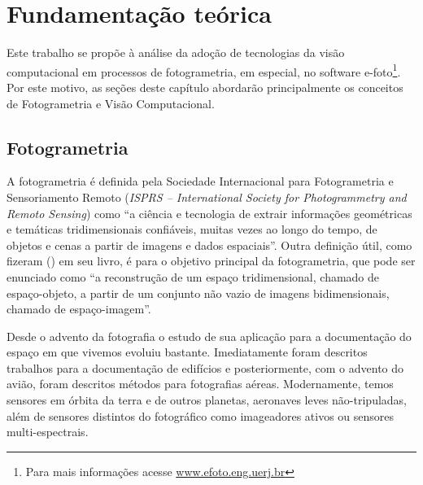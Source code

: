 \chapter{Fundamentação teórica}\label{chp:fund}


Este trabalho se propõe à análise da adoção de tecnologias da visão computacional em processos de fotogrametria, em especial, no software e-foto\footnote{Para mais informações acesse \url{www.efoto.eng.uerj.br}}. Por este motivo, as seções deste capítulo abordarão principalmente os conceitos de Fotogrametria e Visão Computacional.

\section{Fotogrametria}

A fotogrametria é definida pela Sociedade Internacional para Fotogrametria e Sensoriamento Remoto (\textit{ISPRS – International Society for Photogrammetry and Remoto Sensing}) como ``a ciência e tecnologia de extrair informações geométricas e temáticas tridimensionais confiáveis, muitas vezes ao longo do tempo, de objetos e cenas a partir de imagens e dados espaciais''\cite{isprs2021}. Outra definição útil, como fizeram  (\citeyear{coelho2007fotogrametria}) em seu livro, é para o objetivo principal da fotogrametria, que pode ser enunciado como ``a reconstrução de um espaço tridimensional, chamado de espaço-objeto, a partir de um conjunto não vazio de imagens bidimensionais, chamado de espaço-imagem''. 

Desde o advento da fotografia o estudo de sua aplicação para a documentação do espaço em que vivemos evoluiu bastante. Imediatamente foram descritos trabalhos para a documentação de edifícios e posteriormente, com o advento do avião, foram descritos métodos para fotografias aéreas. Modernamente, temos sensores em órbita da terra e de outros planetas, aeronaves leves não-tripuladas, além de sensores distintos do fotográfico como imageadores ativos ou sensores multi-espectrais.

